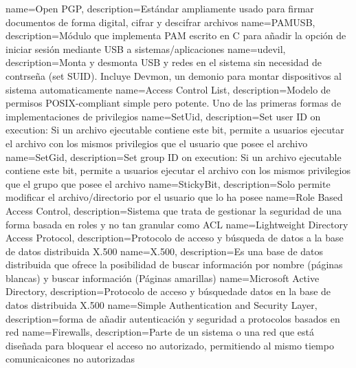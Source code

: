 {
	name=Open PGP,
	description={Estándar ampliamente usado para firmar documentos de forma digital, cifrar y descifrar archivos}
}
{
	name=PAMUSB,
	description={Módulo que implementa PAM escrito en C para añadir la opción de iniciar sesión mediante USB a sistemas/aplicaciones}
}
{
	name=udevil,
	description={Monta y desmonta USB y redes en el sistema sin necesidad de contrseña (set SUID). Incluye Devmon, un demonio para montar dispositivos al sistema automaticamente}
}
{
	name=Access Control List,
	description={Modelo de permisos POSIX-compliant simple pero potente. Uno de las primeras formas de implementaciones de privilegios}
}
{
	name=SetUid,
	description={Set user ID on execution: Si un archivo ejecutable contiene este bit, permite a usuarios ejecutar el archivo con los mismos privilegios que el usuario que posee el archivo}
}
{
	name=SetGid,
	description={Set group ID on execution: Si un archivo ejecutable contiene este bit, permite a usuarios ejecutar el archivo con los mismos privilegios que el grupo que posee el archivo}
}
{
	name=StickyBit,
	description={Solo permite modificar el archivo/directorio por el usuario que lo ha posee}
}
{
	name=Role Based Access Control,
	description={Sistema que trata de gestionar la seguridad de una forma basada en roles y no tan granular como ACL}
}
{
	name=Lightweight Directory Access Protocol,
	description={Protocolo de acceso y búsqueda de datos a la base de datos distribuida X.500}
}
{
	name=X.500,
	description={Es una base de datos distribuida que ofrece la posibilidad de buscar información por nombre (páginas blancas) y buscar información (Páginas amarillas)}
}
{
	name=Microsoft Active Directory,
	description={Protocolo de acceso y búsquedade datos en la base de datos distribuida X.500}
}
{
	name=Simple Authentication and Security Layer,
	description={forma de añadir autenticación y seguridad a protocolos basados en red}
}
{
	name=Firewalls,
	description={Parte de un sistema o una red que está diseñada para bloquear el acceso no autorizado, permitiendo al mismo tiempo comunicaicones no autorizadas}
}
